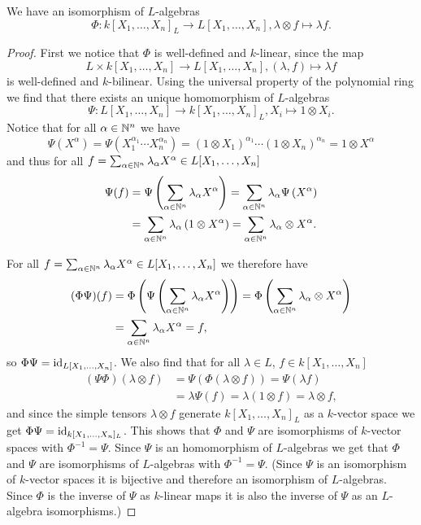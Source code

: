 \begin{prop}
 We have an isomorphism of $L$-algebras
 \[
  \Phi \colon k[X_1, \dotsc, X_n]_L \to L[X_1, \dotsc, X_n], \lambda \otimes f \mapsto \lambda f.
 \]
\end{prop}
\begin{proof}
 First we notice that $\Phi$ is well-defined and $k$-linear, since the map
 \[
  L \times k[X_1, \dotsc, X_n] \to L[X_1, \dotsc, X_n], (\lambda,f) \mapsto \lambda f
 \]
 is well-defined and $k$-bilinear. Using the universal property of the polynomial ring we find that there exists an unique homomorphism of $L$-algebras
 \[
  \Psi \colon L[X_1, \dotsc, X_n] \to k[X_1, \dotsc, X_n]_L, X_i \mapsto 1 \otimes X_i.
 \]
 Notice that for all $\alpha \in \mathbb{N}^n$ we have
 \[
    \Psi\left( X^\alpha \right)
  = \Psi\left( X_1^{\alpha_1} \dotsm X_n^{\alpha_n} \right)
  = (1 \otimes X_1)^{\alpha_1} \dotsm (1 \otimes X_n)^{\alpha_n}
  = 1 \otimes X^\alpha
 \]
 and thus for all $f = \sum_{\alpha \in \mathbb{N}^n} \lambda_\alpha X^\alpha \in L[X_1, \ldots, X_n]$
 \begin{align*}
     \Psi(f)
  &= \Psi\left( \sum_{\alpha \in \mathbb{N}^n} \lambda_\alpha X^\alpha \right)
   = \sum_{\alpha \in \mathbb{N}^n} \lambda_\alpha \Psi\left( X^\alpha \right) \\
  &= \sum_{\alpha \in \mathbb{N}^n} \lambda_\alpha \left( 1 \otimes X^\alpha \right)
   = \sum_{\alpha \in \mathbb{N}^n} \lambda_\alpha \otimes X^\alpha.
 \end{align*}

 For all $f = \sum_{\alpha \in \mathbb{N}^n} \lambda_\alpha X^\alpha \in L[X_1, \ldots, X_n]$ we therefore have
 \begin{align*}
     (\Phi\Psi)(f)
  &= \Phi\left(\Psi\left( \sum_{\alpha \in \mathbb{N}^n} \lambda_\alpha X^\alpha \right)\right)
  = \Phi\left( \sum_{\alpha \in \mathbb{N}^n} \lambda_\alpha \otimes X^\alpha \right) \\
  &= \sum_{\alpha \in \mathbb{N}^n} \lambda_\alpha X^\alpha
  = f,
 \end{align*}
 so $\Phi \Psi = \operatorname{id}_{L[X_1, \dotsc, X_n]}$. We also find that for all $\lambda \in L$, $f \in k[X_1, \dotsc, X_n]$
 \begin{align*}
    (\Psi\Phi)(\lambda \otimes f)
  &= \Psi(\Phi(\lambda \otimes f))
  = \Psi(\lambda f) \\
  &= \lambda \Psi(f)
  = \lambda(1 \otimes f)
  = \lambda \otimes f,
 \end{align*}
 and since the simple tensors $\lambda \otimes f$ generate $k[X_1, \dotsc, X_n]_L$ as a $k$-vector space we get $\Phi \Psi = \operatorname{id}_{k[X_1, \dotsc, X_n]_L}$. This shows that $\Phi$ and $\Psi$ are isomorphisms of $k$-vector spaces with $\Phi^{-1} = \Psi$. Since $\Psi$ is an homomorphism of $L$-algebras we get that $\Phi$ and $\Psi$ are isomorphisms of $L$-algebras with $\Phi^{-1} = \Psi$. (Since $\Psi$ is an isomorphism of $k$-vector spaces it is bijective and therefore an isomorphism of $L$-algebras. Since $\Phi$ is the inverse of $\Psi$ as $k$-linear maps it is also the inverse of $\Psi$ as an $L$-algebra isomorphisms.)
\end{proof}


